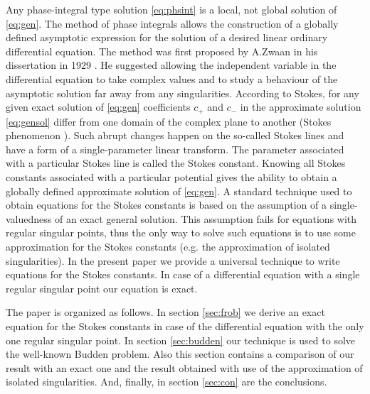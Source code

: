 \documentclass[aip,jmp,reprint]{revtex4-1}
\begin{document}
Any phase-integral type solution \eqref{eq:phsint} is a local, not global solution of \eqref{eq:gen}. 
The method of phase integrals allows the construction of a globally defined 
asymptotic expression for the solution of a desired linear ordinary differential 
equation. The method was first proposed by A.Zwaan in his dissertation in 1929 \cite{zwaan}. 
He suggested allowing the independent variable in the differential equation to take 
complex values and to study a behaviour of the asymptotic solution far away from any 
singularities. According to Stokes\cite{stokes}, for any given exact solution 
of \eqref{eq:gen} coefficients $c_+$ and $c_-$ in the approximate solution \eqref{eq:gensol} 
differ from one domain of the complex plane to another 
(Stokes phenomenon \cite{stokes,rwbook,heading,frbook}). Such abrupt 
changes happen on the so-called Stokes lines and have a form of a single-parameter 
linear transform\cite{heading}. The parameter associated with a particular Stokes line 
is called the Stokes constant. Knowing all Stokes constants associated with a particular 
potential gives the ability\cite{heading,rwbook} to obtain a globally defined approximate solution 
of \eqref{eq:gen}. A standard technique\cite{frpaper} used to obtain
equations for the Stokes constants is based on the assumption of a single-valuedness of
an exact general solution. This assumption fails for equations with regular singular points, thus
the only way to solve such equations is to use some approximation for the Stokes constants
(e.g. the approximation of isolated singularities). In the present paper we provide a universal
technique to write equations for the Stokes constants. In case of a differential equation with
a single regular singular point our equation is exact.

The paper is organized as follows.
In section \ref{sec:frob} we derive an exact equation for the Stokes constants in case of the differential
equation with the only one regular singular point. 
In section \ref{sec:budden} our technique is used to solve the well-known Budden problem. Also this
section contains a comparison of our result with an exact one and the result obtained with use
of the approximation of isolated singularities.
And, finally, in section \ref{sec:con} are the conclusions. 
\end{document}
